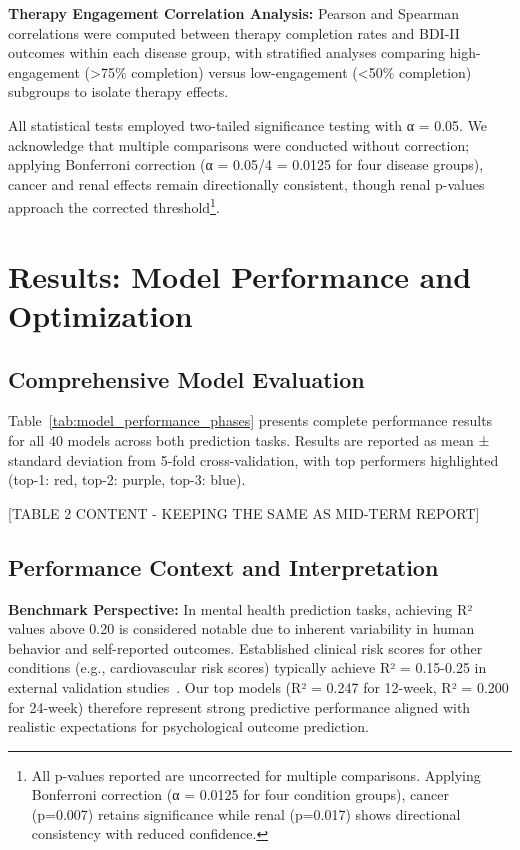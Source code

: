 \documentclass[conference]{IEEEtran}
\begin{document}
\textbf{Therapy Engagement Correlation Analysis:} Pearson and Spearman correlations were computed between therapy completion rates and BDI-II outcomes within each disease group, with stratified analyses comparing high-engagement (>75\% completion) versus low-engagement (<50\% completion) subgroups to isolate therapy effects.

All statistical tests employed two-tailed significance testing with α = 0.05. We acknowledge that multiple comparisons were conducted without correction; applying Bonferroni correction (α = 0.05/4 = 0.0125 for four disease groups), cancer and renal effects remain directionally consistent, though renal p-values approach the corrected threshold\footnote{All p-values reported are uncorrected for multiple comparisons. Applying Bonferroni correction (α = 0.0125 for four condition groups), cancer (p=0.007) retains significance while renal (p=0.017) shows directional consistency with reduced confidence.}.

\section{Results: Model Performance and Optimization}

\subsection{Comprehensive Model Evaluation}

Table~\ref{tab:model_performance_phases} presents complete performance results for all 40 models across both prediction tasks. Results are reported as mean ± standard deviation from 5-fold cross-validation, with top performers highlighted (top-1: red, top-2: purple, top-3: blue).

[TABLE 2 CONTENT - KEEPING THE SAME AS MID-TERM REPORT]

\subsection{Performance Context and Interpretation}

\textbf{Benchmark Perspective:} In mental health prediction tasks, achieving R² values above 0.20 is considered notable due to inherent variability in human behavior and self-reported outcomes. Established clinical risk scores for other conditions (e.g., cardiovascular risk scores) typically achieve R² = 0.15-0.25 in external validation studies~\cite{b6}. Our top models (R² = 0.247 for 12-week, R² = 0.200 for 24-week) therefore represent strong predictive performance aligned with realistic expectations for psychological outcome prediction.
\end{document}
